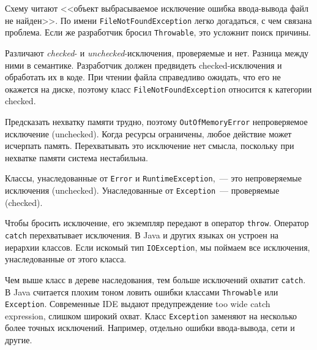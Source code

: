 \linegap

\ifx\DEVICETYPE\MOBILE


\else


\fi

\linegap

\mnoindent
Схему читают <<объект \arr выбрасываемое \arr исключение \arr ошибка
ввода-вывода \arr файл не найден>>. По имени \verb|FileNotFoundException|
легко догадаться, с чем связана проблема. Если же разработчик бросил
\verb|Throwable|, это усложнит поиск причины.

Различают \emph{checked}- и \emph{unchecked}-исключения, проверяемые и
нет. Разница между ними в семантике. Разработчик должен предвидеть checked-исключения и обработать их в коде. При чтении файла справедливо ожидать, что его
не окажется на диске, поэтому класс \verb|FileNotFoundException| относится к
категории checked.


\label{exc-hierarchy}

Предсказать нехватку памяти трудно, поэтому \verb|OutOfMemoryError|
непроверяемое исключение (unchecked). Когда ресурсы ограничены, любое действие
может исчерпать память. Перехватывать это исключение нет смысла, поскольку при
нехватке памяти система нестабильна.


Классы, унаследованные от \verb|Error| и \texttt{Runtime\-Exception},~--- это
непроверяемые исключения (unchecked). Унаследованные от \verb|Exception|~---
проверяемые (checked).


Чтобы бросить исключение, его экземпляр передают в оператор
\verb|throw|. Оператор \verb|catch| перехватывает исключения. В Java и
других языках он устроен на иерархии классов. Если искомый тип
\verb|IOException|, мы поймаем все исключения, унаследованные от этого класса.

Чем выше класс в дереве наследования, тем больше исключений охватит
\verb|catch|. В Java считается плохим тоном ловить ошибки классами
\verb|Throwable| или \verb|Exception|. Современные IDE выдают предупреждение
too wide catch expression, слишком широкий охват. Класс \verb|Exception|
заменяют на несколько более точных исключений. Например, отдельно ошибки
ввода-вывода, сети и другие.

